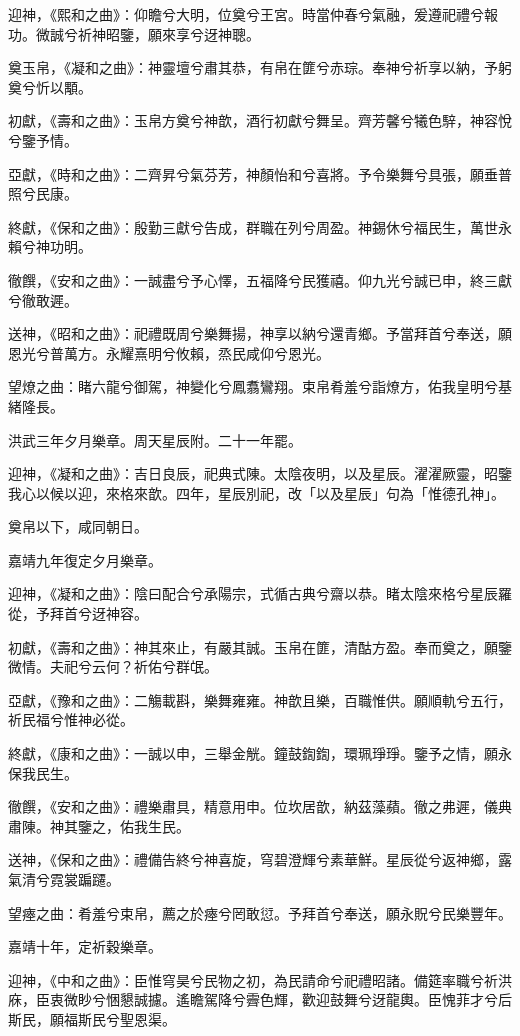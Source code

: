 迎神，《熙和之曲》：仰瞻兮大明，位奠兮王宮。時當仲春兮氣融，爰遵祀禮兮報功。微誠兮祈神昭鑒，願來享兮迓神聰。

奠玉帛，《凝和之曲》：神靈壇兮肅其恭，有帛在篚兮赤琮。奉神兮祈享以納，予躬奠兮忻以顒。

初獻，《壽和之曲》：玉帛方奠兮神歆，酒行初獻兮舞呈。齊芳馨兮犧色騂，神容悅兮鑒予情。

亞獻，《時和之曲》：二齊昇兮氣芬芳，神顏怡和兮喜將。予令樂舞兮具張，願垂普照兮民康。

終獻，《保和之曲》：殷勤三獻兮告成，群職在列兮周盈。神錫休兮福民生，萬世永賴兮神功明。

徹饌，《安和之曲》：一誠盡兮予心懌，五福降兮民獲禧。仰九光兮誠已申，終三獻兮徹敢遲。

送神，《昭和之曲》：祀禮既周兮樂舞揚，神享以納兮還青鄉。予當拜首兮奉送，願恩光兮普萬方。永耀熹明兮攸賴，烝民咸仰兮恩光。

望燎之曲：睹六龍兮御駕，神變化兮鳳翥鸞翔。束帛肴羞兮詣燎方，佑我皇明兮基緒隆長。

洪武三年夕月樂章。周天星辰附。二十一年罷。

迎神，《凝和之曲》：吉日良辰，祀典式陳。太陰夜明，以及星辰。濯濯厥靈，昭鑒我心以候以迎，來格來歆。四年，星辰別祀，改「以及星辰」句為「惟德孔神」。

奠帛以下，咸同朝日。

嘉靖九年復定夕月樂章。

迎神，《凝和之曲》：陰曰配合兮承陽宗，式循古典兮齋以恭。睹太陰來格兮星辰羅從，予拜首兮迓神容。

初獻，《壽和之曲》：神其來止，有嚴其誠。玉帛在篚，清酤方盈。奉而奠之，願鑒微情。夫祀兮云何？祈佑兮群氓。

亞獻，《豫和之曲》：二觴載斟，樂舞雍雍。神歆且樂，百職惟供。願順軌兮五行，祈民福兮惟神必從。

終獻，《康和之曲》：一誠以申，三舉金觥。鐘鼓鍧鍧，環珮琤琤。鑒予之情，願永保我民生。

徹饌，《安和之曲》：禮樂肅具，精意用申。位坎居歆，納茲藻蘋。徹之弗遲，儀典肅陳。神其鑒之，佑我生民。

送神，《保和之曲》：禮備告終兮神喜旋，穹碧澄輝兮素華鮮。星辰從兮返神鄉，露氣清兮霓裳蹁躚。

望瘞之曲：肴羞兮束帛，薦之於瘞兮罔敢愆。予拜首兮奉送，願永貺兮民樂豐年。

嘉靖十年，定祈穀樂章。

迎神，《中和之曲》：臣惟穹昊兮民物之初，為民請命兮祀禮昭諸。備筵率職兮祈洪庥，臣衷微眇兮悃懇誠攄。遙瞻駕降兮霽色輝，歡迎鼓舞兮迓龍輿。臣愧菲才兮后斯民，願福斯民兮聖恩渠。

